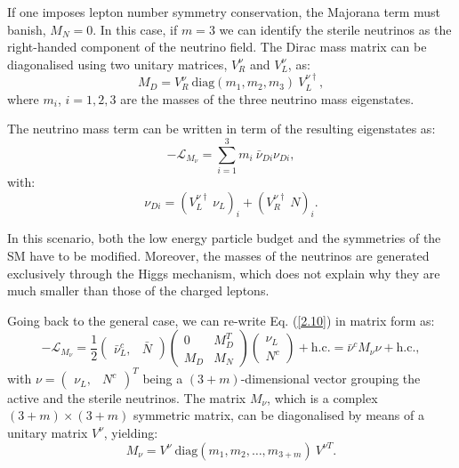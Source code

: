 If one imposes lepton number symmetry conservation, the Majorana term must banish, $M_{N}=0$. In this case, if $m=3$ we can identify the sterile neutrinos as the right-handed component of the neutrino field. The Dirac mass matrix can be diagonalised using two unitary matrices, $V^{\nu}_{R}$ and $V^{\nu}_{L}$, as:
\begin{equation}
	M_{D} = V^{\nu}_{R}~\mathrm{diag}(m_{1}, m_{2}, m_{3})~V^{\nu \dagger}_{L},
\end{equation}
where $m_{i}$, $i=1,2,3$ are the masses of the three neutrino mass eigenstates.

The neutrino mass term can be written in term of the resulting eigenstates as:
\begin{equation}
	-\mathcal{L}_{M_{\nu}} = \sum_{i=1}^{3} m_{i}~\bar{\nu}_{Di} \nu_{Di},
\end{equation}
with:
\begin{equation}
	\nu_{Di} = \left(V^{\nu \dagger}_{L}~\nu_{L}\right)_{i} + \left(V^{\nu \dagger}_{R}~N\right)_{i}.
\end{equation}

In this scenario, both the low energy particle budget and the symmetries of the SM have to be modified. Moreover, the masses of the neutrinos are generated exclusively through the Higgs mechanism, which does not explain why they are much smaller than those of the charged leptons.

Going back to the general case, we can re-write Eq. (\ref{2.10}) in matrix form as:
\begin{equation}
	-\mathcal{L}_{M_{\nu}} = \frac{1}{2} \begin{pmatrix}\bar{\nu}^{c}_{L},&\bar{N}\end{pmatrix} \begin{pmatrix}0 & M_{D}^{T}\\M_{D} & M_{N}\end{pmatrix}\begin{pmatrix}\nu_{L}\\N^{c}\end{pmatrix} + \mathrm{h.c.} = \bar{\nu}^{c} M_{\nu} \nu + \mathrm{h.c.},
\end{equation}
with $\nu=\begin{pmatrix}\nu_{L}, & N^{c}\end{pmatrix}^{T}$ being a $(3+m)$-dimensional vector grouping the active and the sterile neutrinos. The matrix $M_{\nu}$, which is a complex $(3+m)\times(3+m)$ symmetric matrix, can be diagonalised by means of a unitary matrix $V^{\nu}$, yielding:
\begin{equation}
	M_{\nu} = V^{\nu}~\mathrm{diag}(m_{1}, m_{2}, \dots, m_{3+m})~V^{\nu T}.
\end{equation}

